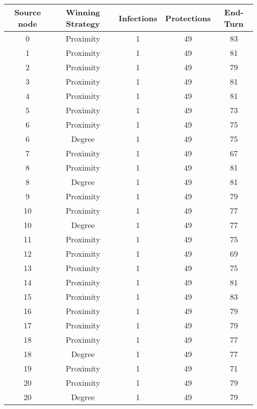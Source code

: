 \documentclass[results.tex]{subfiles}
\begin{document}
\begin{center}
  \begin{tabular}{| c || c | c | c | c |}
    \hline
    {\bfseries Source node} & {\bfseries Winning Strategy} & {\bfseries Infections} & {\bfseries Protections} & {\bfseries End-Turn} \\  %
    \hline\hline
    0 & Proximity & 1 & 49 & 83 \\ 
    \hline
    1 & Proximity & 1 & 49 & 81 \\ 
    \hline
    2 & Proximity & 1 & 49 & 79 \\ 
    \hline
    3 & Proximity & 1 & 49 & 81 \\ 
    \hline
    4 & Proximity & 1 & 49 & 81 \\ 
    \hline
    5 & Proximity & 1 & 49 & 73 \\ 
    \hline
    6 & Proximity & 1 & 49 & 75 \\ 
    \hline
    6 & Degree & 1 & 49 & 75 \\ 
    \hline
    7 & Proximity & 1 & 49 & 67 \\ 
    \hline
    8 & Proximity & 1 & 49 & 81 \\ 
    \hline
    8 & Degree & 1 & 49 & 81 \\ 
    \hline
    9 & Proximity & 1 & 49 & 79 \\ 
    \hline
    10 & Proximity & 1 & 49 & 77 \\ 
    \hline
    10 & Degree & 1 & 49 & 77 \\ 
    \hline
    11 & Proximity & 1 & 49 & 75 \\ 
    \hline
    12 & Proximity & 1 & 49 & 69 \\ 
    \hline
    13 & Proximity & 1 & 49 & 75 \\ 
    \hline
    14 & Proximity & 1 & 49 & 81 \\ 
    \hline
    15 & Proximity & 1 & 49 & 83 \\ 
    \hline
    16 & Proximity & 1 & 49 & 79 \\ 
    \hline
    17 & Proximity & 1 & 49 & 79 \\ 
    \hline
    18 & Proximity & 1 & 49 & 77 \\ 
    \hline
    18 & Degree & 1 & 49 & 77 \\ 
    \hline
    19 & Proximity & 1 & 49 & 71 \\ 
    \hline
    20 & Proximity & 1 & 49 & 79 \\ 
    \hline
    20 & Degree & 1 & 49 & 79 \\ 

\end{tabular}
\end{center}
\end{document}
